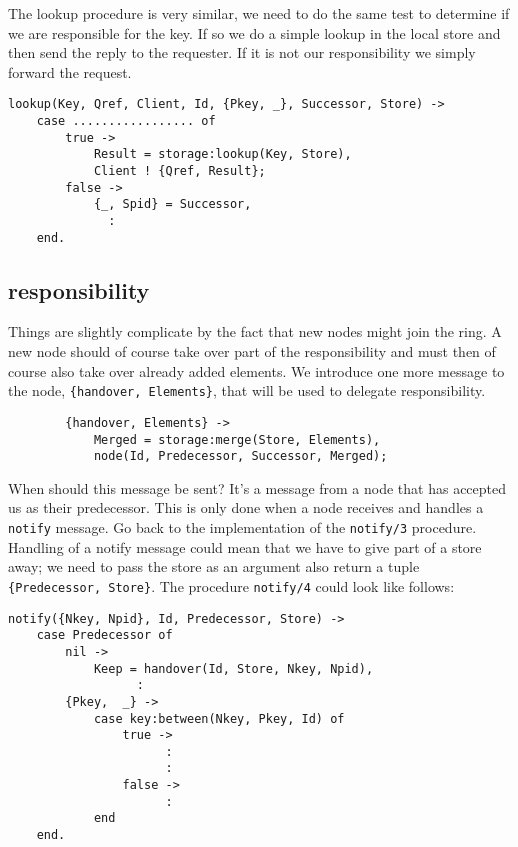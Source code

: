 \documentclass[a4paper,11pt]{article}
\begin{document}
The lookup procedure is very similar, we need to do the same test to
determine if we are responsible for the key. If so we do a simple
lookup in the local store and then send the reply to the requester. If
it is not our responsibility we simply forward the request.

\begin{verbatim}
lookup(Key, Qref, Client, Id, {Pkey, _}, Successor, Store) ->
    case ................. of
        true ->
            Result = storage:lookup(Key, Store),
            Client ! {Qref, Result};
        false ->
            {_, Spid} = Successor,
              :
    end.
\end{verbatim}

\subsection{responsibility}

Things are slightly complicate by the fact that new nodes might join
the ring. A new node should of course take over part of the
responsibility and must then of course also take over already added
elements. We introduce one more message to the node, {\tt \{handover,
  Elements\}}, that will be used to delegate responsibility.

\begin{verbatim}
        {handover, Elements} ->
            Merged = storage:merge(Store, Elements),
            node(Id, Predecessor, Successor, Merged);       
\end{verbatim}

When should this message be sent? It's a message from a node that has
accepted us as their predecessor. This is only done when a node
receives and handles a {\tt notify} message. Go back to the
implementation of the {\tt notify/3} procedure. Handling of a notify
message could mean that we have to give part of a store away; we need
to pass the store as an argument also return a tuple
{\tt\{Predecessor, Store\}}. The procedure {\tt notify/4} could look
like follows:

\begin{verbatim}
notify({Nkey, Npid}, Id, Predecessor, Store) ->
    case Predecessor of
        nil ->
            Keep = handover(Id, Store, Nkey, Npid),
                  :
        {Pkey,  _} ->
            case key:between(Nkey, Pkey, Id) of
                true ->
                      :
                      :
                false -> 
                      :
            end
    end.
\end{verbatim}
\end{document}
